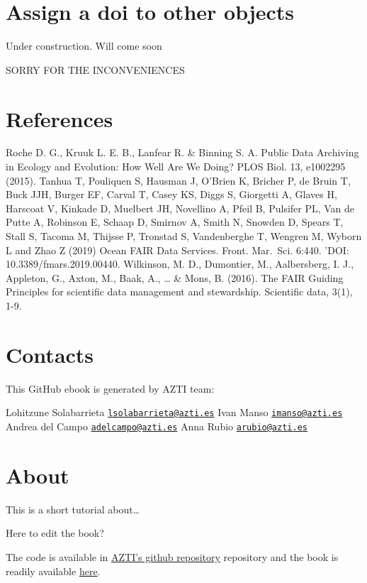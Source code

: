 \documentclass[
]{book}
\begin{document}
\hypertarget{assign-a-doi-to-other-objects}{%
\chapter{Assign a doi to other objects}\label{assign-a-doi-to-other-objects}}

Under construction. Will come soon

SORRY FOR THE INCONVENIENCES

\hypertarget{references}{%
\chapter{References}\label{references}}

Roche D. G., Kruuk L. E. B., Lanfear R. \& Binning S. A. Public Data Archiving in Ecology and Evolution: How Well Are We Doing? PLOS Biol. 13, e1002295 (2015).
Tanhua T, Pouliquen S, Hausman J, O'Brien K, Bricher P, de Bruin T, Buck JJH, Burger EF, Carval T, Casey KS, Diggs S, Giorgetti A, Glaves H, Harscoat V, Kinkade D, Muelbert JH, Novellino A, Pfeil B, Pulsifer PL, Van de Putte A, Robinson E, Schaap D, Smirnov A, Smith N, Snowden D, Spears T, Stall S, Tacoma M, Thijsse P, Tronstad S, Vandenberghe T, Wengren M, Wyborn L and Zhao Z (2019) Ocean FAIR Data Services. Front. Mar.~Sci. 6:440. 'DOI: 10.3389/fmars.2019.00440.
Wilkinson, M. D., Dumontier, M., Aalbersberg, I. J., Appleton, G., Axton, M., Baak, A., \ldots{} \& Mons, B. (2016). The FAIR Guiding Principles for scientific data management and stewardship. Scientific data, 3(1), 1-9.

\hypertarget{contacts}{%
\chapter{Contacts}\label{contacts}}

This GitHub ebook is generated by AZTI team:

Lohitzune Solabarrieta \href{mailto:lsolabarrieta@azti.es}{\nolinkurl{lsolabarrieta@azti.es}}
Ivan Manso \href{mailto:imanso@azti.es}{\nolinkurl{imanso@azti.es}}
Andrea del Campo \href{mailto:adelcampo@azti.es}{\nolinkurl{adelcampo@azti.es}}
Anna Rubio \href{mailto:arubio@azti.es}{\nolinkurl{arubio@azti.es}}

\hypertarget{about-1}{%
\chapter*{About}\label{about-1}}

This is a short tutorial about\ldots{}

Here to edit the book?

The code is available in \href{https://github.com/Fundacion-AZTI/ebegi_quickguide2DOIs}{AZTI's github repository} repository and the book is readily available \href{https://fundacion-azti.github.io/ebegi_quickguide2DOIs/}{here}.

  
\end{document}
